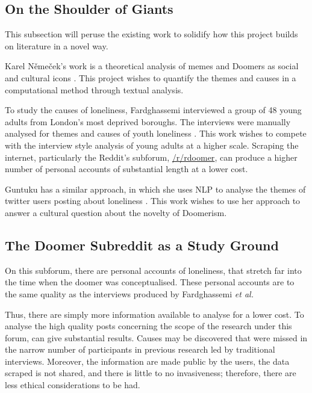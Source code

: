 \documentclass[../report.tex]{subfiles}
\begin{document}
\subsection{On the Shoulder of Giants}
This subsection will peruse the existing work to solidify how this project builds on literature in a novel way. 

Karel Němeček's work is a theoretical analysis of memes and Doomers as social and cultural icons \cite{memes_reservoir}.
This project wishes to quantify the themes and causes in a computational method through textual analysis.

To study the causes of loneliness, Fardghassemi interviewed a group of 48 young adults from London's most deprived boroughs. The interviews were manually analysed for themes and causes of youth loneliness \cite{fardghassemi_interviews}.
This work wishes to compete with the interview style analysis of young adults at a higher scale.
Scraping the internet, particularly the Reddit's subforum,
\href{www.reddit.com/r/doomer}{/r/rdoomer},
can produce a higher number of personal accounts of substantial length at a lower cost.

Guntuku has a similar approach, in which she uses NLP to analyse the themes of twitter users posting about loneliness \cite{twitter_loneliness}.
This work wishes to use her approach to answer a cultural question about the novelty of Doomerism.

\subsection{The Doomer Subreddit as a Study Ground}

On this subforum, there are personal accounts of loneliness, that stretch far into the time when the doomer was conceptualised. 
These personal accounts are to the same quality as the interviews produced by Fardghassemi \textit{et al.}

Thus, there are simply more information available to analyse for a lower cost. To analyse the high quality posts concerning the scope of the research under this forum, can give substantial results.
Causes may be discovered that were missed in the narrow number of participants in previous research led by traditional interviews.
Moreover, the information are made public by the users, the data scraped is not shared, and there is little to no invasiveness; therefore, there are less ethical considerations to be had.
\end{document}
